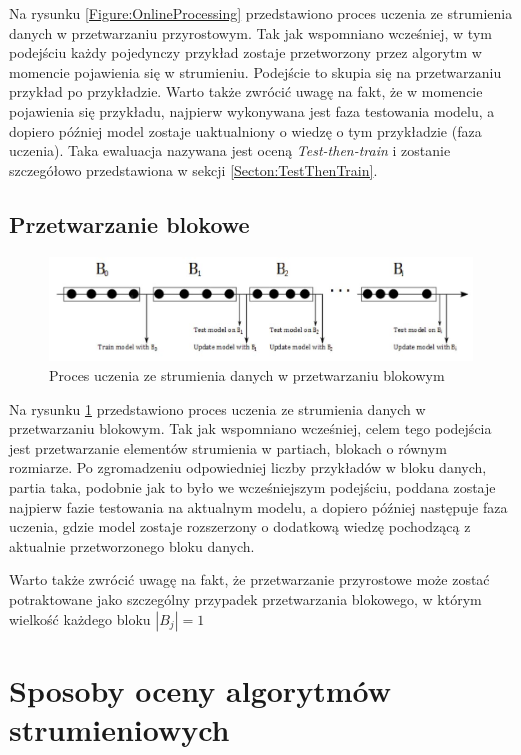 \noindent Na rysunku \ref{Figure:OnlineProcessing} przedstawiono proces uczenia ze strumienia danych w przetwarzaniu przyrostowym. Tak jak wspomniano wcześniej, w tym podejściu każdy pojedynczy przykład zostaje przetworzony przez algorytm w momencie pojawienia się w strumieniu. Podejście to skupia się na przetwarzaniu przykład po przykładzie. Warto także zwrócić uwagę na fakt, że w momencie pojawienia się przykładu, najpierw wykonywana jest faza testowania modelu, a dopiero później model zostaje uaktualniony o wiedzę o tym przykładzie (faza uczenia). Taka ewaluacja nazywana jest oceną \textit{Test-then-train} i zostanie szczegółowo przedstawiona w sekcji \ref{Secton:TestThenTrain}. 

\subsection{Przetwarzanie blokowe}

\begin{figure}[h] 
    \centering
    \includegraphics[width=15cm]{figures/block_processing.JPG}
    \caption{Proces uczenia ze strumienia danych w przetwarzaniu blokowym \cite{BrzezPhd2015}}\label{Figure:BlockProcessing}
\end{figure}

\noindent Na rysunku \ref{Figure:BlockProcessing} przedstawiono proces uczenia ze strumienia danych w przetwarzaniu blokowym. Tak jak wspomniano wcześniej, celem tego podejścia jest przetwarzanie elementów strumienia w partiach, blokach o równym rozmiarze. Po zgromadzeniu odpowiedniej liczby przykładów w bloku danych, partia taka, podobnie jak to było we wcześniejszym podejściu, poddana zostaje najpierw fazie testowania na aktualnym modelu, a dopiero później następuje faza uczenia, gdzie model zostaje rozszerzony o dodatkową wiedzę pochodzącą z aktualnie przetworzonego bloku danych.

\noindent Warto także zwrócić uwagę na fakt, że przetwarzanie przyrostowe może zostać potraktowane jako szczególny przypadek przetwarzania blokowego, w którym wielkość każdego bloku $|B_j| = 1$

\section{Sposoby oceny algorytmów strumieniowych}

